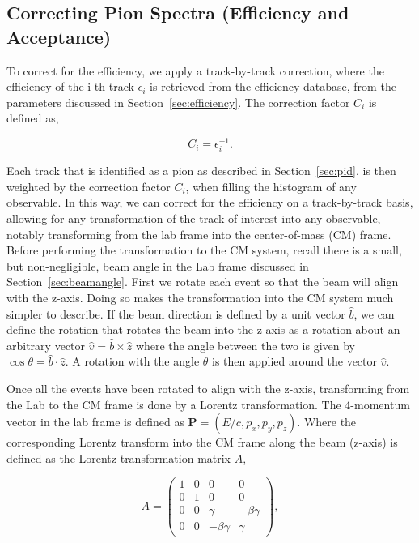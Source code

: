 \subsection{Correcting Pion Spectra (Efficiency and Acceptance)}
\label{sec:corrSpectra}
To correct for the efficiency, we apply a track-by-track correction, where the efficiency of the i-th track $\epsilon_i$ is retrieved from the efficiency database, from the parameters discussed in Section~\ref{sec:efficiency}. The correction factor $C_i$ is defined as,

\begin{equation}
C_i = \epsilon_i^{-1}.
\label{eq:effCorrFactor}
\end{equation}

Each track that is identified as a pion as described in Section~\ref{sec:pid}, is then weighted by the correction factor $C_i$, when filling the histogram of any observable. In this way, we can correct for the efficiency on a track-by-track basis, allowing for any transformation of the track of interest into any observable, notably transforming from the lab frame into the center-of-mass (CM) frame. Before performing the transformation to the CM system, recall there is a small, but non-negligible, beam angle in the Lab frame discussed in Section~\ref{sec:beamangle}. First we rotate each event so that the beam will align with the z-axis. Doing so makes the transformation into the CM system much simpler to describe. If the beam direction is defined by a unit vector $\hat{b}$, we can define the rotation that rotates the beam into the z-axis as a rotation about an arbitrary vector $\hat{v} = \hat{b}\times\hat{z}$ where the angle between the two is given by $\cos \theta = \hat{b}\cdot\hat{z}$. A rotation with the angle $\theta$ is then applied around the vector $\hat{v}$.

Once all the events have been rotated to align with the z-axis, transforming from the Lab to the CM frame is done by a Lorentz transformation. The 4-momentum vector in the lab frame is defined as $\textbf{P} = (E/c,p_x,p_y,p_z)$. Where the corresponding Lorentz transform into the CM frame along the beam (z-axis) is defined as the Lorentz transformation matrix $A$,

\begin{equation}
A = \begin{pmatrix}
1 & 0 & 0 & 0\\
0 & 1 & 0 & 0\\
0 & 0 & \gamma & -\beta \gamma\\
0 & 0 & -\beta \gamma & \gamma
\end{pmatrix},
\end{equation}


